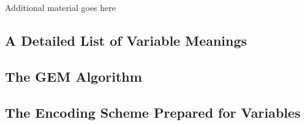 Additional material goes here

\subsection{A Detailed List of Variable Meanings}
\label{subsec:listofvars}

\subsection{The GEM Algorithm}
\label{subsec:gem}

\subsection{The Encoding Scheme Prepared for Variables}
\label{subsec:encodescheme}